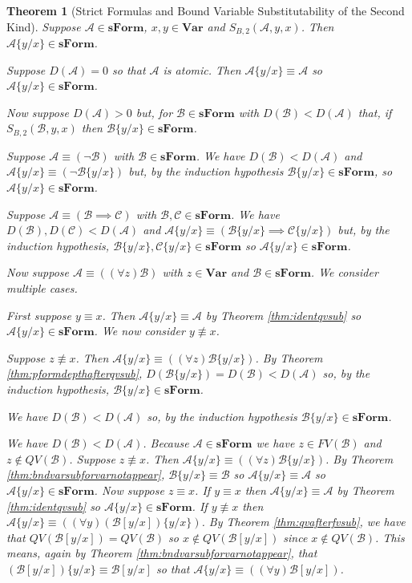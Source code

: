 \documentclass[12pt]{article}
\theoremstyle{break}
\theoremstyle{break}
\newtheorem{theorem}{Theorem}[section]
\theoremstyle{break}
\theoremstyle{break}
\theoremstyle{break}
\newtheorem{informal definition}[definition]{Informal Definition}
\newcommand{\mc}[1]{\mathcal{#1}}
\begin{document}
\begin{theorem}[Strict Formulas and Bound Variable Substitutability of the Second Kind]
Suppose $\mc{A}\in\textbf{sForm}$, $x, y \in\textbf{Var}$ and $S_{B,2}(\mc{A}, y, x)$.
Then $\mc{A}\{y/x\} \in \textbf{sForm}$.

Suppose $D(\mc{A}) = 0$ so that $\mc{A}$ is atomic.
Then $\mc{A}\{y/x\} \equiv \mc{A}$ so $\mc{A}\{y/x\} \in\textbf{sForm}$.

Now suppose $D(\mc{A})>0$ but, for $\mc{B}\in\textbf{sForm}$ with $D(\mc{B})<D(\mc{A})$ that, if $S_{B,2}(\mc{B}, y, x)$ then $\mc{B}\{y/x\}\in\textbf{sForm}$.

Suppose $\mc{A}\equiv (\lnot \mc{B})$ with $\mc{B}\in\textbf{sForm}$.
We have $D(\mc{B}) < D(\mc{A})$ and $\mc{A}\{y/x\} \equiv (\lnot \mc{B}\{y/x\})$ but, by the induction hypothesis $\mc{B}\{y/x\}\in\textbf{sForm}$, so $\mc{A}\{y/x\}\in\textbf{sForm}$.

Suppose $\mc{A}\equiv (\mc{B}\implies \mc{C})$ with $\mc{B}, \mc{C}\in\textbf{sForm}$.
We have $D(\mc{B}), D(\mc{C}) < D(\mc{A})$ and $\mc{A}\{y/x\} \equiv (\mc{B}\{y/x\} \implies \mc{C}\{y/x\})$ but, by the induction hypothesis, $\mc{B}\{y/x\}, \mc{C}\{y/x\}\in\textbf{sForm}$ so $\mc{A}\{y/x\}\in\textbf{sForm}$.

Now suppose $\mc{A}\equiv((\forall z)\mc{B})$ with $z\in\textbf{Var}$ and $\mc{B}\in\textbf{sForm}$.
We consider multiple cases.

First suppose $y\equiv x$.
Then $\mc{A}\{y/x\} \equiv \mc{A}$ by Theorem \ref{thm:identqvsub} so $\mc{A}\{y/x\} \in \textbf{sForm}$.
We now consider $y\not \equiv x$.

Suppose $z\not \equiv x$.
Then $\mc{A}\{y/x\} \equiv ((\forall z) \mc{B}\{y/x\})$.
By Theorem \ref{thm:pformdepthafterqvsub}, $D(\mc{B}\{y/x\}) = D(\mc{B}) < D(\mc{A})$ so, by the induction hypothesis, $\mc{B}\{y/x\}\in\textbf{sForm}$.




We have $D(\mc{B}) < D(\mc{A})$ so, by the induction hypothesis $\mc{B}\{y/x\} \in \textbf{sForm}$.




We have $D(\mc{B}) < D(\mc{A})$.
Because $\mc{A}\in\textbf{sForm}$ we have $z\in FV(\mc{B})$ and $z\not \in QV(\mc{B})$.
Suppose $z\not \equiv x$.
Then $\mc{A}\{y/x\} \equiv ((\forall z) \mc{B}\{y/x\})$.
By Theorem \ref{thm:bndvarsubforvarnotappear}, $\mc{B}\{y/x\} \equiv \mc{B}$ so $\mc{A}\{y/x\} \equiv \mc{A}$ so $\mc{A}\{y/x\} \in\textbf{sForm}$.
Now suppose $z \equiv x$.
If $y\equiv x$ then $\mc{A}\{y/x\} \equiv \mc{A}$ by Theorem \ref{thm:identqvsub} so $\mc{A}\{y/x\}\in\textbf{sForm}$.
If $y\not \equiv x$ then $\mc{A}\{y/x\} \equiv ((\forall y) (\mc{B}[y/x])\{y/x\})$.
By Theorem \ref{thm:qvafterfvsub}, we have that $QV(\mc{B}[y/x]) = QV(\mc{B})$ so $x\not \in QV(\mc{B}[y/x])$ since $x\not \in QV(\mc{B})$.
This means, again by Theorem \ref{thm:bndvarsubforvarnotappear}, that $(\mc{B}[y/x])\{y/x\} \equiv \mc{B}[y/x]$ so that $\mc{A}\{y/x\} \equiv ((\forall y) \mc{B}[y/x])$.




\end{theorem}
\end{document}
